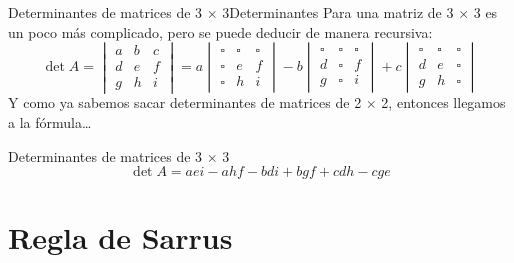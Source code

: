 \documentclass[spanish, c]{beamer}
\begin{document}
\begin{frame}{Determinantes de matrices de 3 $\times$ 3}{Determinantes}
    Para una matriz de 3 $\times$ 3 es un poco más complicado, pero se puede deducir de manera recursiva:
    $$\det A = \begin{vmatrix*}
        a & b & c \\ d & e & f \\ g & h & i
    \end{vmatrix*} =
     a \begin{vmatrix} \square & \square & \square \\ \square & e & f \\ \square & h & i \end{vmatrix}
    -b \begin{vmatrix} \square & \square & \square \\ d & \square & f \\ g & \square & i \end{vmatrix}
    +c \begin{vmatrix} \square & \square & \square \\ d & e & \square \\ g & h & \square \end{vmatrix}
    $$
    Y como ya sabemos sacar determinantes de matrices de 2 $\times$ 2, entonces llegamos a la fórmula\dots

    \begin{block}{Determinantes de matrices de 3 $\times$ 3}
        $$\det A = aei - ahf - bdi + bgf + cdh - cge$$
    \end{block}
\end{frame}

\section{Regla de Sarrus}
\end{document}
